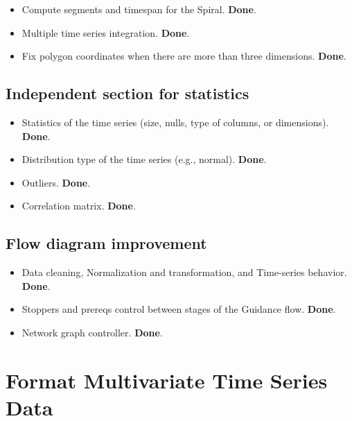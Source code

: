 \documentclass[a4paper]{article}
\begin{document}
\begin{itemize}
\item Compute segments and timespan for the Spiral. \textbf{Done}.

\item Multiple time series integration. \textbf{Done}.

\item Fix polygon coordinates when there are more than three dimensions. \textbf{Done}.
\end{itemize}

\subsection{Independent section for statistics}
\label{sec:org9b384d0}

\begin{itemize}
\item Statistics of the time series (size, nulls, type of columns, or dimensions). \textbf{Done}.

\item Distribution type of the time series (e.g., normal). \textbf{Done}.

\item Outliers. \textbf{Done}.

\item Correlation matrix. \textbf{Done}.
\end{itemize}

\subsection{Flow diagram improvement}
\label{sec:org76850a2}

\begin{itemize}
\item Data cleaning, Normalization and transformation, and Time-series behavior. \textbf{Done}.

\item Stoppers and prereqs control between stages of the Guidance flow. \textbf{Done}.

\item Network graph controller. \textbf{Done}.
\end{itemize}

\section{Format Multivariate Time Series Data}
\label{sec:orgaf8a77a}
\end{document}
